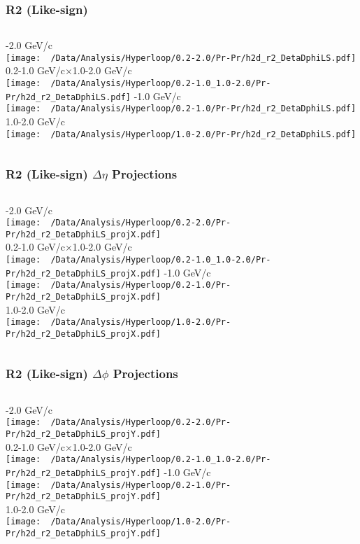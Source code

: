 \documentclass{beamer}
\begin{document}
\begin{frame}
	\frametitle{R2 (Like-sign)}
	\begin{columns}
		-2.0 GeV/c\\
		\texttt{[image: ~/Data/Analysis/Hyperloop/0.2-2.0/Pr-Pr/h2d\_r2\_DetaDphiLS.pdf]}\\0.2-1.0 GeV/c$\times$1.0-2.0 GeV/c\\
		\texttt{[image: ~/Data/Analysis/Hyperloop/0.2-1.0\_1.0-2.0/Pr-Pr/h2d\_r2\_DetaDphiLS.pdf]}
		-1.0 GeV/c\\
		\texttt{[image: ~/Data/Analysis/Hyperloop/0.2-1.0/Pr-Pr/h2d\_r2\_DetaDphiLS.pdf]}\\1.0-2.0 GeV/c\\
		\texttt{[image: ~/Data/Analysis/Hyperloop/1.0-2.0/Pr-Pr/h2d\_r2\_DetaDphiLS.pdf]}
	\end{columns}
\end{frame}
\begin{frame}
	\frametitle{R2 (Like-sign) $\Delta\eta$ Projections}
	\begin{columns}
		\column{0.5\textwidth}
		-2.0 GeV/c\\
		\texttt{[image: ~/Data/Analysis/Hyperloop/0.2-2.0/Pr-Pr/h2d\_r2\_DetaDphiLS\_projX.pdf]}\\0.2-1.0 GeV/c$\times$1.0-2.0 GeV/c\\
		\texttt{[image: ~/Data/Analysis/Hyperloop/0.2-1.0\_1.0-2.0/Pr-Pr/h2d\_r2\_DetaDphiLS\_projX.pdf]}
		\column{0.5\textwidth}
		-1.0 GeV/c\\
		\texttt{[image: ~/Data/Analysis/Hyperloop/0.2-1.0/Pr-Pr/h2d\_r2\_DetaDphiLS\_projX.pdf]}\\1.0-2.0 GeV/c\\
		\texttt{[image: ~/Data/Analysis/Hyperloop/1.0-2.0/Pr-Pr/h2d\_r2\_DetaDphiLS\_projX.pdf]}
	\end{columns}
\end{frame}
\begin{frame}
	\frametitle{R2 (Like-sign) $\Delta\phi$ Projections}
	\begin{columns}
		-2.0 GeV/c\\
		\texttt{[image: ~/Data/Analysis/Hyperloop/0.2-2.0/Pr-Pr/h2d\_r2\_DetaDphiLS\_projY.pdf]}\\0.2-1.0 GeV/c$\times$1.0-2.0 GeV/c\\
		\texttt{[image: ~/Data/Analysis/Hyperloop/0.2-1.0\_1.0-2.0/Pr-Pr/h2d\_r2\_DetaDphiLS\_projY.pdf]}
		-1.0 GeV/c\\
		\texttt{[image: ~/Data/Analysis/Hyperloop/0.2-1.0/Pr-Pr/h2d\_r2\_DetaDphiLS\_projY.pdf]}\\1.0-2.0 GeV/c\\
		\texttt{[image: ~/Data/Analysis/Hyperloop/1.0-2.0/Pr-Pr/h2d\_r2\_DetaDphiLS\_projY.pdf]}
	\end{columns}
\end{frame}
\end{document}
